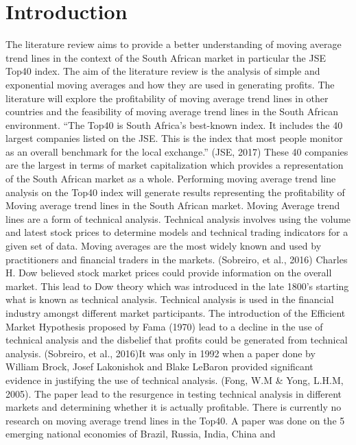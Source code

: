 \documentclass[12pt,preprint, authoryear]{elsarticle}
\numberwithin{equation}{section}
\numberwithin{figure}{section}
\numberwithin{table}{section}
\begin{document}
\section{Introduction}\label{introduction}

The literature review aims to provide a better understanding of moving
average trend lines in the context of the South African market in
particular the JSE Top40 index. The aim of the literature review is the
analysis of simple and exponential moving averages and how they are used
in generating profits. The literature will explore the profitability of
moving average trend lines in other countries and the feasibility of
moving average trend lines in the South African environment. ``The Top40
is South Africa's best-known index. It includes the 40 largest companies
listed on the JSE. This is the index that most people monitor as an
overall benchmark for the local exchange.'' (JSE, 2017) These 40
companies are the largest in terms of market capitalization which
provides a representation of the South African market as a whole.
Performing moving average trend line analysis on the Top40 index will
generate results representing the profitability of Moving average trend
lines in the South African market. Moving Average trend lines are a form
of technical analysis. Technical analysis involves using the volume and
latest stock prices to determine models and technical trading indicators
for a given set of data. Moving averages are the most widely known and
used by practitioners and financial traders in the markets. (Sobreiro,
et al., 2016) Charles H. Dow believed stock market prices could provide
information on the overall market. This lead to Dow theory which was
introduced in the late 1800's starting what is known as technical
analysis. Technical analysis is used in the financial industry amongst
different market participants. The introduction of the Efficient Market
Hypothesis proposed by Fama (1970) lead to a decline in the use of
technical analysis and the disbelief that profits could be generated
from technical analysis. (Sobreiro, et al., 2016)It was only in 1992
when a paper done by William Brock, Josef Lakonishok and Blake LeBaron
provided significant evidence in justifying the use of technical
analysis. (Fong, W.M \& Yong, L.H.M, 2005). The paper lead to the
resurgence in testing technical analysis in different markets and
determining whether it is actually profitable. There is currently no
research on moving average trend lines in the Top40. A paper was done on
the 5 emerging national economies of Brazil, Russia, India, China and
\end{document}
